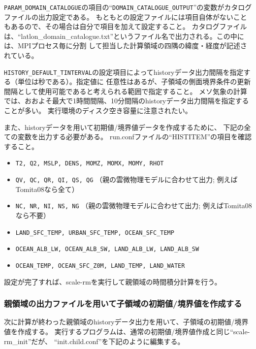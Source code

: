 \verb|PARAM_DOMAIN_CATALOGUE|の項目の``\verb|DOMAIN_CATALOGUE_OUTPUT|''の変数がカタログファイルの出力設定である。
もともとの設定ファイルには項目自体がないこともあるので、その場合は自分で項目を加えて設定すること。
カタログファイルは、``latlon\_domain\_catalogue.txt''というファイル名で出力される。この中には、MPIプロセス毎に分割
して担当した計算領域の四隅の緯度・経度が記述されている。

\verb|HISTORY_DEFAULT_TINTERVAL|の設定項目によってhistoryデータ出力間隔を指定する（単位は秒である）。指定値に
任意性はあるが、子領域の側面境界条件の更新間隔として使用可能であると考えられる範囲で指定すること。
メソ気象の計算では、おおよそ最大で1時間間隔、10分間隔のhistoryデータ出力間隔を指定することが多い。
実行環境のディスク空き容量に注意されたい。


また、historyデータを用いて初期値/境界値データを作成するために、
下記の全ての変数を出力する必要がある。
run.confファイルの``HISTITEM''の項目を確認すること。

\begin{itemize}
 \item \verb|T2, Q2, MSLP, DENS, MOMZ, MOMX, MOMY, RHOT|
 \item \verb|QV, QC, QR, QI, QS, QG| {\small （親の雲微物理モデルに合わせて出力; 例えばTomita08なら全て）}
 \item \verb|NC, NR, NI, NS, NG| {\small （親の雲微物理モデルに合わせて出力; 例えばTomita08なら不要）}
 \item \verb|LAND_SFC_TEMP, URBAN_SFC_TEMP, OCEAN_SFC_TEMP|
 \item \verb|OCEAN_ALB_LW, OCEAN_ALB_SW, LAND_ALB_LW, LAND_ALB_SW|
 \item \verb|OCEAN_TEMP, OCEAN_SFC_Z0M, LAND_TEMP, LAND_WATER|
\end{itemize}

設定が完了すれば、scale-rmを実行して親領域の時間積分計算を行う。


\subsubsection{親領域の出力ファイルを用いて子領域の初期値/境界値を作成する}
次に計算が終わった親領域のhistoryデータ出力を用いて、子領域の初期値/境界値を作成する。
実行するプログラムは、通常の初期値/境界値作成と同じ``scale-rm\_init''だが、
``init.child.conf''を下記のように編集する。\\

